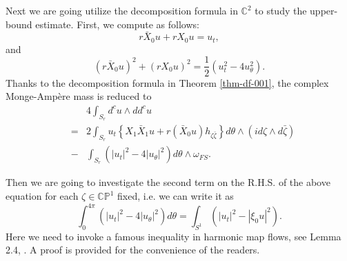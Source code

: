 \documentclass[a4paper,11pt]{amsart}
\numberwithin{equation}{section}
\def\bC{{\mathbb C}}
\def\bP{{\mathbb P}}
\def\z{{\zeta}}
\begin{document}
Next we are going utilize the decomposition formula in $\bC^2$
to study the upper-bound estimate. 
First, we compute as follows: 
\begin{equation}
\label{ld-003}
r \bar X_0 u + r X_0 u = u_t,
\end{equation}
and 
\begin{equation}
\label{ld-004}
( r \bar X_0 u )^2 + ( r X_0 u)^2 = \frac{1}{2} (u_t^2 - 4 u_{\theta}^2).
\end{equation}
Thanks to the decomposition formula in Theorem \ref{thm-df-001}, 
the complex Monge-Amp\`ere mass is reduced to 
\begin{eqnarray}
\label{ld-005}
&& 4 \int_{S_r} d^cu \wedge dd^c u
 \nonumber\\
 &=& 2 \int_{S_r} u_t \left\{ X_1 \bar X_1 u +  r(\bar X_0 u) h_{\z\bar\z} \right\} d\theta \wedge (i d\z \wedge d\bar\z)
 \nonumber\\
 &-& \int_{S_r} \left( |u_t|^2 - 4 | u_{\theta}|^2 \right)  d\theta \wedge \omega_{FS}. 
\end{eqnarray}

Then we are going to investigate the second term
on the R.H.S. of the above equation for each $\z\in \bC\bP^1$ fixed, 
i.e. we can write it as 
$$  \int_{0}^{4\pi} (|u_t|^2 - 4 |u_{\theta}|^2)  d\theta = \int_{S^1} ( |u_t|^2 - |\xi_0 u|^2 ). $$
Here we need to invoke a famous inequality in harmonic map flows, see Lemma 2.4, \cite{LW98}. 
A proof is provided for the convenience of the readers. 
\end{document}
